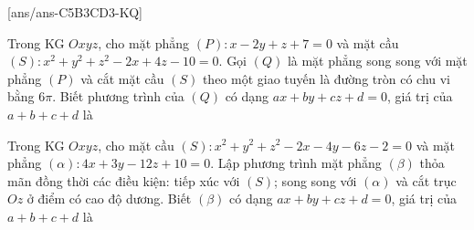 [ans/ans-C5B3CD3-KQ]
\TNSA
\begin{ex}%
	Trong KG $Oxyz$, cho mặt phẳng $(P)\colon x-2y+z+7=0$ và mặt cầu $(S)\colon x^2+y^2+z^2-2x+4z-10=0$. Gọi $(Q)$ là mặt phẳng song song với mặt phẳng $(P)$ và cắt mặt cầu $(S)$ theo một giao tuyến là đường tròn có chu vi bằng $6\pi$. Biết phương trình của $(Q)$ có dạng $ax+by+cz+d=0$, giá trị của $a+b+c+d$ là
\end{ex}
\begin{ex}%
	Trong KG $Oxyz$, cho mặt cầu $(S)\colon x^2+y^2+z^2-2x-4y-6z-2=0$ và mặt phẳng $(\alpha)\colon 4x+3y-12z+10=0$. Lập phương trình mặt phẳng $(\beta)$ thỏa mãn đồng thời các điều kiện: tiếp xúc với $(S)$; song song với $(\alpha)$ và cắt trục $Oz$ ở điểm có cao độ dương. Biết $(\beta)$ có dạng $ax+by+cz+d=0$, giá trị của $a+b+c+d$ là
\end{ex}

